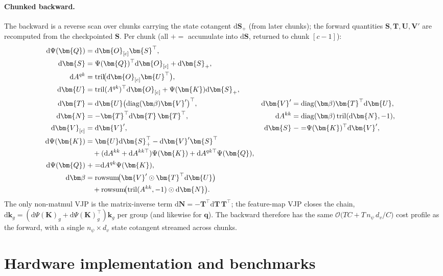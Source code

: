 \documentclass{article}
\newcommand{\1}{\bm{1}}
\newcommand{\diag}{\mathop{\mathrm{diag}}}
\def\vk{{\bm{k}}}
\def\vq{{\bm{q}}}
\def\mK{{\bm{K}}}
\def\mN{{\bm{N}}}
\def\mO{{\bm{O}}}
\def\mQ{{\bm{Q}}}
\def\mS{{\bm{S}}}
\def\mT{{\bm{T}}}
\def\mU{{\bm{U}}}
\def\mV{{\bm{V}}}
\def\gO{{\mathcal{O}}}
\newcommand{\dd}{\mathrm{d}}
\newcommand{\seql}{T}
\theoremstyle{definition}
\begin{document}
\paragraph{Chunked backward.} The backward is a reverse scan over chunks carrying the state
cotangent $\dd\mS_{+}$ (from later chunks); the forward quantities $\mS,\mT,\mU,\mV'$ are recomputed
from the checkpointed $\mS$. Per chunk (all $\mathrel{+}{=}$ accumulate into $\dd\mS$, returned to
chunk $[c{-}1]$):
\begin{align}
  \dd\Psi(\mQ)
    &= \dd\mO_{[c]}\mS^\top,
  \notag\\
  \dd\mS
    &= \Psi(\mQ)^\top\dd\mO_{[c]} + \dd\mS_{+},
  \notag\\
  \dd A^{qk}
    &= \mathrm{tril}\!\bigl(\dd\mO_{[c]}\mU^\top\bigr),
  \notag\\
  \dd\mU
    &= \mathrm{tril}(A^{qk})^\top\dd\mO_{[c]}
       + \Psi(\mK)\dd\mS_{+},
  \notag\\
  \dd\mT
    &= \dd\mU\bigl(\diag(\bm\beta)\mV'\bigr)^\top,
  &
  \dd\mV'
    &= \diag(\bm\beta)\mT^\top\dd\mU,
  \notag\\
  \dd\mN
    &= -\mT^\top\dd\mT\,\mT^\top,
  &
  \dd A^{kk}
    &= \diag(\bm\beta)\,\mathrm{tril}(\dd\mN,-1),
  \notag\\
  \dd\mV_{[c]}
    &= \dd\mV',
  &
  \dd\mS
    &\mathrel{-}{=} \Psi(\mK)^\top\dd\mV',
  \notag\\
  \dd\Psi(\mK)
    &= \mU\dd\mS_{+}^\top-\dd\mV'\mS^\top
  \notag\\
    &\quad
       +(\dd A^{kk}+\dd A^{kk\top})\Psi(\mK)
       +\dd A^{qk\top}\Psi(\mQ),
  \notag\\
  \dd\Psi(\mQ)
    &\mathrel{+}{=} \dd A^{qk}\Psi(\mK),
  \notag\\
  \dd\bm\beta
    &= \mathrm{rowsum}\!\bigl(\mV'\odot\mT^\top\dd\mU\bigr)
  \notag\\
    &\quad
       +\mathrm{rowsum}\!\bigl(\mathrm{tril}(A^{kk},-1)\odot\dd\mN\bigr).
  \label{eq:delta-bwd}
\end{align}
The only non-matmul VJP is the matrix-inverse term $\dd\mN=-\mT^\top\dd\mT\,\mT^\top$; the
feature-map VJP closes the chain, $\dd\vk_g=(\dd\Psi(\mK)_g+\dd\Psi(\mK)_g^\top)\vk_g$ per group
(and likewise for $\vq$). The backward therefore has the same $\gO\!\big(\seql C + \seql\,n_\psi\,d_v/C\big)$ cost
profile as the forward, with a single $n_\psi\times d_v$ state cotangent streamed across chunks.



\section{Hardware implementation and benchmarks}
\label{app:hardware-details}
\end{document}
